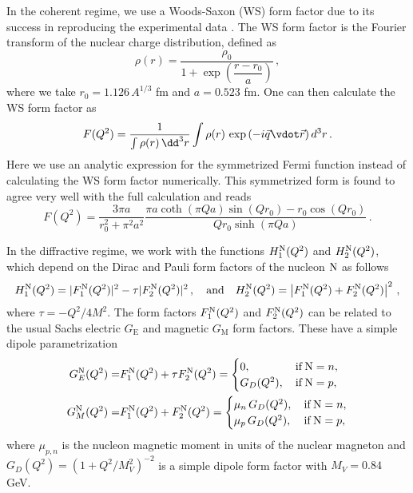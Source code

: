 

In the coherent regime, we use a Woods-Saxon (WS) form factor due to its success in reproducing the experimental data \cite{Fricke:1995zz,Jentschura2009}. The WS form factor is the Fourier transform of the nuclear charge distribution, defined as 
%
\begin{equation}
 \rho(r) = \frac{\rho_0}{1+\exp\left(\dfrac{r - r_0}{a}\right)} \, ,
\end{equation}
%
where we take $r_0 = 1.126 \, A^{1/3}$ fm and $a = 0.523$ fm. One can then calculate the WS form factor as
%
\begin{equation}
 F(Q^2) = \frac{1}{\int \rho(r) \, \dd^3r}  \int \rho(r) \, \exp\left( -i \vec{q} \vdot \vec{r}\right) d^3r \, .
\end{equation}
%
Here we use an analytic expression for the symmetrized Fermi function \cite{Anni1994,Sprung1997} instead of calculating the WS form factor numerically. This symmetrized form is found to agree very well with the full calculation and reads
%
\begin{equation}
  F(Q^2) =  \frac{3 \pi  a}{r_0^2 + \pi^2 a^2} \frac{\pi a \coth{(\pi Q a)} \sin{(Q r_0)} - r_0 \cos{(Q r_0)} }{Q r_0 \sinh{(\pi Q a)}}\, .
\end{equation}
%

In the diffractive regime, we work with the functions $H_1^{\rm N}(Q^2)$ and $H_2^{\rm N}(Q^2)$, which depend on the Dirac and Pauli form factors of the nucleon ${\rm N}$ as follows
%
\begin{equation}
H_1^{\rm N}(Q^2)= |F_1^{\rm N}(Q^2)|^2 - \tau |F_2^{\rm N}(Q^2)|^2\, , \quad \mathrm{and} \quad H_2^{\rm N}(Q^2) = \left| F_1^{\rm N}(Q^2) + F_2^{\rm N}(Q^2)\right|^2 \, ,
\end{equation}
%
where $\tau = -Q^2/4M^2$. The form factors $F_1^{\rm N}(Q^2)$ and $F_2^{\rm N}(Q^2)$ can be related to the usual Sachs electric $G_\mathrm{E}$ and magnetic $G_{\mathrm{M}}$ form factors. These have a simple dipole parametrization
%
\begin{align}
G^{\rm N}_E(Q^2) =& F^{\rm N}_1 (Q^2) + \tau F^{\rm N}_2 (Q^2) = \begin{cases}
                                              0,\, &\mathrm{if }\, {\rm N} = n,\\
                                              G_D(Q^2),\, &\mathrm{if }\, {\rm N} = p,
                                              \end{cases} \\
G^{\rm N}_M(Q^2) =& F^{\rm N}_1 (Q^2) + F^{\rm N}_2 (Q^2) = \begin{cases}
                                              \mu_n  \, G_D(Q^2),\, &\mathrm{if }\, {\rm N} = n,\\
                                              \mu_p  \, G_D(Q^2),\, &\mathrm{if }\, {\rm N} = p,
                                              \end{cases}
\end{align}
%
where $\mu_{p,n}$ is the nucleon magnetic moment in units of the nuclear magneton and $G_D(Q^2) = (1 + Q^2/M_V^2)^{-2}$ is a simple dipole form factor with $M_V = 0.84$ GeV.
%



